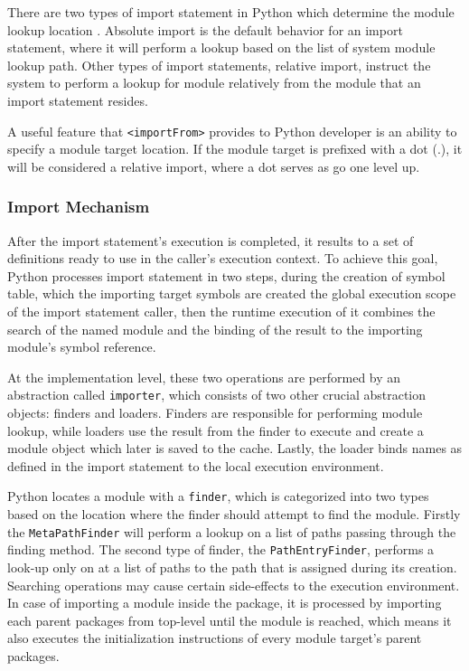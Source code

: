 There are two types of import statement in Python which determine the module lookup location \cite{pep328}. Absolute import is the default behavior for an import statement, where it will perform a lookup based on the list of system module lookup path. Other types of import statements, relative import, instruct the system to perform a lookup for module relatively from the module that an import statement resides.

A useful feature that \texttt{<importFrom>} provides to Python developer is an ability to specify a module target location. If the module target is prefixed with a dot (.), it will be considered a relative import, where a dot serves as go one level up.


\subsubsection{Import Mechanism}

After the import statement's execution is completed, it results to a set of definitions ready to use in the caller's execution context.
To achieve this goal, Python processes import statement in two steps, during the creation of symbol table, which the importing target symbols are created the global execution scope of the import statement caller, then the runtime execution of it combines the search of the named module and the binding of the result to the importing module's symbol reference.

At the implementation level, these two operations are performed by an abstraction called \texttt{importer}, which consists of two other crucial abstraction objects: finders and loaders.
Finders are responsible for performing module lookup, while loaders use the result from the finder to execute and create a module object which later is saved to the cache.
Lastly, the loader binds names as defined in the import statement to the local execution environment.

Python locates a module with a \texttt{finder}, which is categorized into two types based on the location where the finder should attempt to find the module.
Firstly the \texttt{MetaPathFinder} will perform a lookup on a list of paths passing through the finding method.
The second type of finder, the \texttt{PathEntryFinder}, performs a look-up only on at a list of paths to the path that is assigned during its creation.
Searching operations may cause certain side-effects to the execution environment. In case of importing a module inside the package, it is processed by importing each parent packages from top-level until the module is reached, which means it also executes the initialization instructions of every module target's parent packages.

